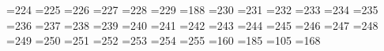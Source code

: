 =224 %
{}=225 %
{}=226 %
{}=227 %
{}=228 %
{}=229 %
{}=188 %
{}=230 %
{}=231 %
{}=232 %
{}=233 %
{}=234 %
{}=235 %
{}=236 %
{}=237 %
{}=238 %
{}=239 %
{}=240 %
{}=241 %
{}=242 %
{}=243 %
{}=244 %
{}=245 %
{}=246 %
{}=247 %
{}=248 %
{}=249 %
{}=250 %
{}=251 %
{}=252 %
{}=253 %
{}=254 %
{}=255 %
{}=160 %
{}=185 %
{}=105 %
{}=168 %
